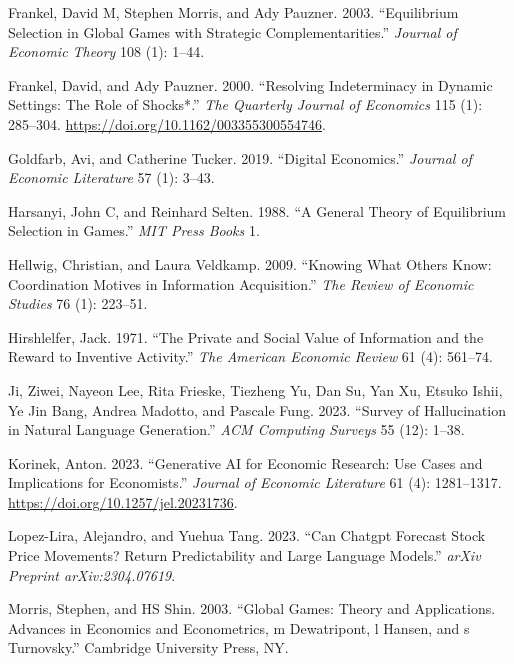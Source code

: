 \documentclass[
]{article}
\newlength{\cslhangindent}
\newenvironment{CSLReferences}[2] %
 {\begin{list}{}{%
  \setlength{\itemindent}{0pt}
  \setlength{\leftmargin}{0pt}
  \setlength{\parsep}{0pt}
  \ifodd #1
   \setlength{\leftmargin}{\cslhangindent}
   \setlength{\itemindent}{-1\cslhangindent}
  \fi
  \setlength{\itemsep}{#2\baselineskip}}}
 {\end{list}}
\theoremstyle{definition}
\theoremstyle{plain}
\theoremstyle{remark}
\begin{document}
\begin{CSLReferences}{1}{0}
Frankel, David M, Stephen Morris, and Ady Pauzner. 2003. {``Equilibrium
Selection in Global Games with Strategic Complementarities.''}
\emph{Journal of Economic Theory} 108 (1): 1--44.

Frankel, David, and Ady Pauzner. 2000. {``{Resolving Indeterminacy in
Dynamic Settings: The Role of Shocks*}.''} \emph{The Quarterly Journal
of Economics} 115 (1): 285--304.
\url{https://doi.org/10.1162/003355300554746}.

Goldfarb, Avi, and Catherine Tucker. 2019. {``Digital Economics.''}
\emph{Journal of Economic Literature} 57 (1): 3--43.

Harsanyi, John C, and Reinhard Selten. 1988. {``A General Theory of
Equilibrium Selection in Games.''} \emph{MIT Press Books} 1.

Hellwig, Christian, and Laura Veldkamp. 2009. {``Knowing What Others
Know: Coordination Motives in Information Acquisition.''} \emph{The
Review of Economic Studies} 76 (1): 223--51.

Hirshlelfer, Jack. 1971. {``The Private and Social Value of Information
and the Reward to Inventive Activity.''} \emph{The American Economic
Review} 61 (4): 561--74.

Ji, Ziwei, Nayeon Lee, Rita Frieske, Tiezheng Yu, Dan Su, Yan Xu, Etsuko
Ishii, Ye Jin Bang, Andrea Madotto, and Pascale Fung. 2023. {``Survey of
Hallucination in Natural Language Generation.''} \emph{ACM Computing
Surveys} 55 (12): 1--38.

Korinek, Anton. 2023. {``Generative AI for Economic Research: Use Cases
and Implications for Economists.''} \emph{Journal of Economic
Literature} 61 (4): 1281--1317.
\url{https://doi.org/10.1257/jel.20231736}.

Lopez-Lira, Alejandro, and Yuehua Tang. 2023. {``Can Chatgpt Forecast
Stock Price Movements? Return Predictability and Large Language
Models.''} \emph{arXiv Preprint arXiv:2304.07619}.

Morris, Stephen, and HS Shin. 2003. {``Global Games: Theory and
Applications. Advances in Economics and Econometrics, m Dewatripont, l
Hansen, and s Turnovsky.''} Cambridge University Press, NY.


\end{CSLReferences}
\end{document}
